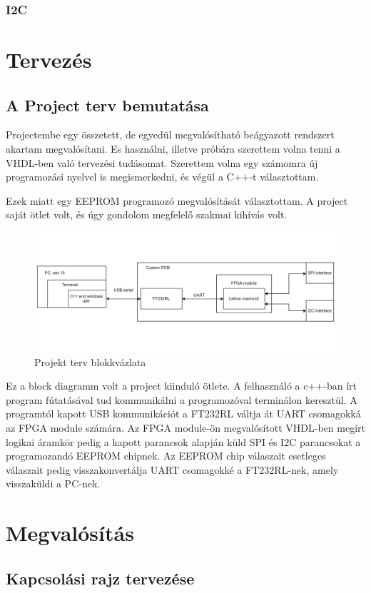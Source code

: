\documentclass[a4paper,12pt,oneside]{book}
\begin{document}
\subsection{I2C}
\chapter{Tervezés}
\section{A Project terv bemutatása}
Projectembe egy összetett, de egyedül megvalósítható beágyazott rendszert akartam megvalósítani. Es használni, illetve próbára szerettem volna tenni a VHDL-ben való tervezési tudásomat. Szerettem volna egy számomra új programozási nyelvel is megismerkedni, és végül a C++-t választottam.

Ezek miatt egy EEPROM programozó megvalósítását választottam. A project saját ötlet volt, és úgy gondolom megfelelő szakmai kihívás volt.
\begin{figure}[H]
	\centering
	\includegraphics[trim=1mm 1mm 1mm 1mm,scale=0.245]{terv1.png}
	\caption{Projekt terv blokkvázlata}
	\label{Projekt terv}
\end{figure}
Ez a block diagramm volt a project kiinduló ötlete. A felhasználó a c++-ban írt program fútatásával tud kommunikálni a programozóval terminálon keresztül. A programtól kapott  USB kommunikációt a FT232RL váltja át UART csomagokká az FPGA module számára. Az FPGA module-ön megvalósított VHDL-ben megírt logikai áramkör pedig a kapott parancsok alapján küld SPI és I2C parancsokat a programozandó EEPROM chipnek. Az EEPROM chip válaszait esetleges válaszait pedig visszakonvertálja UART csomagokké a FT232RL-nek, amely visszaküldi a PC-nek.

\chapter{Megvalósítás}

\section{Kapcsolási rajz tervezése}
\end{document}
